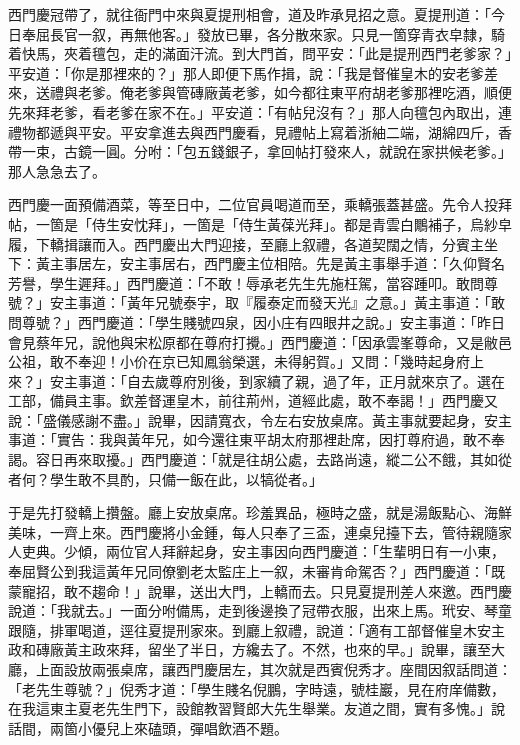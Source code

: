 西門慶冠帶了，就往衙門中來與夏提刑相會，道及昨承見招之意。夏提刑道：「今日奉屈長官一叙，再無他客。」發放已畢，各分散來家。只見一箇穿青衣皁隸，騎着快馬，夾着氊包，走的滿面汗流。到大門首，問平安：「此是提刑西門老爹家？」平安道：「你是那裡來的？」那人即便下馬作揖，說：「我是督催皇木的安老爹差來，送禮與老爹。俺老爹與管磚廠黃老爹，如今都往東平府胡老爹那裡吃酒，順便先來拜老爹，看老爹在家不在。」平安道：「有帖兒沒有？」那人向氊包內取出，連禮物都遞與平安。平安拿進去與西門慶看，見禮帖上寫着浙紬二端，湖綿四斤，香帶一束，古鏡一圓。分咐：「包五錢銀子，拿回帖打發來人，就說在家拱候老爹。」那人急急去了。

西門慶一面預備酒菜，等至日中，二位官員喝道而至，乘轎張蓋甚盛。先令人投拜帖，一箇是「侍生安忱拜」，一箇是「侍生黃葆光拜」。都是青雲白鷳補子，烏紗皁履，下轎揖讓而入。西門慶出大門迎接，至廳上叙禮，各道契闊之情，分賓主坐下：黃主事居左，安主事居右，西門慶主位相陪。先是黃主事舉手道：「久仰賢名芳譽，學生遲拜。」西門慶道：「不敢！辱承老先生先施枉駕，當容踵叩。敢問尊號？」安主事道：「黃年兄號泰宇，取『履泰定而發天光』之意。」黃主事道：「敢問尊號？」西門慶道：「學生賤號四泉，因小庄有四眼井之說。」{}安主事道：「昨日會見蔡年兄，說他與宋松原都在尊府打攪。」西門慶道：「因承雲峯尊命，又是敝邑公祖，敢不奉迎！小价在京已知鳳翁榮選，未得躬賀。」又問：「幾時起身府上來？」安主事道：「自去歲尊府別後，到家續了親，過了年，正月就來京了。選在工部，備員主事。欽差督運皇木，前往荊州，道經此處，敢不奉謁！」西門慶又說：「盛儀感謝不盡。」說畢，因請寬衣，令左右安放桌席。黃主事就要起身，安主事道：「實告：我與黃年兄，如今還往東平胡太府那裡赴席，因打尊府過，敢不奉謁。容日再來取擾。」西門慶道：「就是往胡公處，去路尚遠，縱二公不餓，其如從者何？學生敢不具酌，只備一飯在此，以犒從者。」

于是先打發轎上攢盤。廳上安放桌席。珍羞異品，極時之盛，就是湯飯點心、海鮮美味，一齊上來。西門慶將小金鍾，每人只奉了三盃，連桌兒擡下去，管待親隨家人吏典。少傾，兩位官人拜辭起身，安主事因向西門慶道：「生輩明日有一小東，奉屈賢公到我這黃年兄同僚劉老太監庄上一叙，未審肯命駕否？」西門慶道：「既蒙寵招，敢不趨命！」說畢，送出大門，上轎而去。只見夏提刑差人來邀。西門慶說道：「我就去。」一面分咐備馬，走到後邊換了冠帶衣服，出來上馬。玳安、琴童跟隨，排軍喝道，逕往夏提刑家來。到廳上叙禮，說道：「適有工部督催皇木安主政和磚廠黃主政來拜，留坐了半日，方纔去了。不然，也來的早。」說畢，讓至大廳，上面設放兩張桌席，讓西門慶居左，其次就是西賓倪秀才。{}座間因叙話問道：「老先生尊號？」倪秀才道：「學生賤名倪鵬，字時遠，號桂巖，見在府庠備數，在我這東主夏老先生門下，設館教習賢郎大先生舉業。友道之間，實有多愧。」說話間，兩箇小優兒上來磕頭，彈唱飲酒不題。

